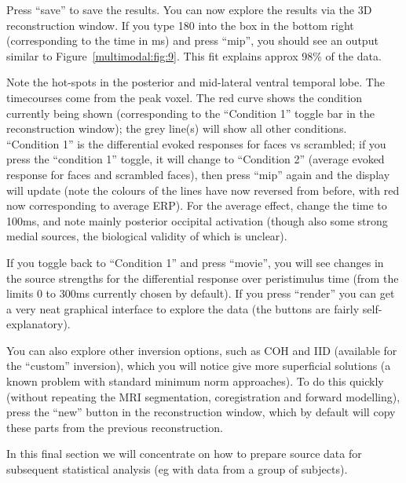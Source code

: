 Press ``save'' to save the results. You can now explore the results via the 3D reconstruction window. If you type 180 into the box in the bottom right (corresponding to the time in ms) and press ``mip'', you should see an output similar to Figure~\ref{multimodal:fig:9}. This fit explains approx 98\% of the data.

Note the hot-spots in the posterior and mid-lateral ventral temporal lobe. The timecourses come from the peak voxel. The red curve shows the condition currently being shown (corresponding to the ``Condition 1'' toggle bar in the reconstruction window); the grey line(s) will show all other conditions. ``Condition 1'' is the differential evoked responses for faces vs scrambled; if you press the ``condition 1'' toggle, it will change to ``Condition 2'' (average evoked response for faces and scrambled faces), then press ``mip'' again and the display will update (note the colours of the lines have now reversed from before, with red now corresponding to average ERP). For the average effect, change the time to 100ms, and note mainly posterior occipital activation (though also some strong medial sources, the biological validity of which is unclear).

If you toggle back to ``Condition 1'' and press ``movie'', you will see changes in the source strengths for the differential response over peristimulus time (from the limits 0 to 300ms currently chosen by default).
If you press ``render'' you can get a very neat graphical interface to explore the data (the buttons are fairly self-explanatory). 

You can also explore other inversion options, such as COH and IID (available for the ``custom'' inversion), which you will notice give more superficial solutions (a known problem with standard minimum norm approaches). To do this quickly (without repeating the MRI segmentation, coregistration and forward modelling), press the ``new'' button in the reconstruction window, which by default will copy these parts from the previous reconstruction.

In this final section we will concentrate on how to prepare source data for subsequent statistical analysis (eg with data from a group of subjects).

